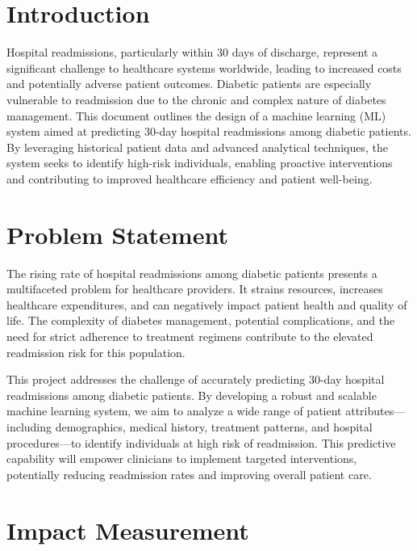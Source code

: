 \documentclass{article}
\begin{document}
\newpage
\tableofcontents
\newpage


\section{Introduction}

Hospital readmissions, particularly within 30 days of discharge, represent a significant challenge to healthcare systems worldwide, leading to increased costs and potentially adverse patient outcomes. Diabetic patients are especially vulnerable to readmission due to the chronic and complex nature of diabetes management. This document outlines the design of a machine learning (ML) system aimed at predicting 30-day hospital readmissions among diabetic patients. By leveraging historical patient data and advanced analytical techniques, the system seeks to identify high-risk individuals, enabling proactive interventions and contributing to improved healthcare efficiency and patient well-being.

\section{Problem Statement}

The rising rate of hospital readmissions among diabetic patients presents a multifaceted problem for healthcare providers. It strains resources, increases healthcare expenditures, and can negatively impact patient health and quality of life. The complexity of diabetes management, potential complications, and the need for strict adherence to treatment regimens contribute to the elevated readmission risk for this population.

This project addresses the challenge of accurately predicting 30-day hospital readmissions among diabetic patients. By developing a robust and scalable machine learning system, we aim to analyze a wide range of patient attributes—including demographics, medical history, treatment patterns, and hospital procedures—to identify individuals at high risk of readmission. This predictive capability will empower clinicians to implement targeted interventions, potentially reducing readmission rates and improving overall patient care.

\section{Impact Measurement}
\end{document}
